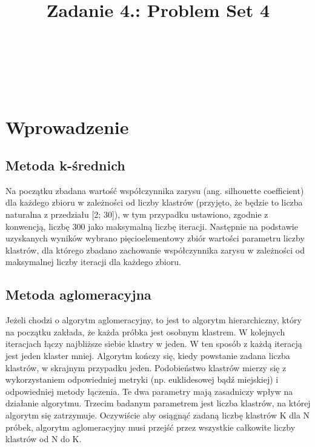\documentclass{classrep}
\author{%
    \studentinfo[239661@edu.p.lodz.pl]{Szymon Gruda}{239661}\\
    \studentinfo[239671@edu.p.lodz.pl]{Jan Karwowski}{239671}\\
    \studentinfo[239673@edu.p.lodz.pl]{Michał Kidawa}{239673}\\
    \studentinfo[239676@edu.p.lodz.pl]{Kamil Kowalewski}{239676}\\
}
\title{Zadanie 4.: Problem Set 4}
\begin{document}
    \maketitle
    \thispagestyle{fancyplain}

    \newpage
    \tableofcontents
    \newpage

    \section{Wprowadzenie}
    \label{intro} {

        \subsection{Metoda k-średnich}
        \label{kmeans_description} {
            Na początku zbadana wartość współczynnika zarysu (ang. silhouette
            coefficient) dla każdego zbioru w zależności od liczby klastrów (przyjęto,
            że będzie to liczba naturalna z przedziału [2; 30]), w tym przypadku
            ustawiono, zgodnie z konwencją, liczbę 300 jako maksymalną liczbę iteracji.
            Następnie na podstawie uzyskanych wyników wybrano pięcioelementowy zbiór
            wartości parametru liczby klastrów, dla którego zbadano zachowanie
            współczynnika zarysu w zależności od maksymalnej liczby iteracji dla
            każdego zbioru.
        }
        
        \subsection{Metoda aglomeracyjna}
        \label{agglomerative_description} {
            Jeżeli chodzi o algorytm aglomeracyjny, to jest to algorytm hierarchiczny,
            który na początku zakłada, że każda próbka jest osobnym klastrem. W
            kolejnych iteracjach łączy najbliższe siebie klastry w jeden. W ten sposób
            z każdą iteracją jest jeden klaster mniej. Algorytm kończy się, kiedy
            powstanie zadana liczba klastrów, w skrajnym przypadku jeden. Podobieństwo
            klastrów mierzy się z wykorzystaniem odpowiedniej metryki (np. euklidesowej
            bądź miejskiej) i odpowiedniej metody łączenia. Te dwa parametry mają
            zasadniczy wpływ na działanie algorytmu. Trzecim badanym parametrem jest
            liczba klastrów, na której algorytm się zatrzymuje. Oczywiście aby osiągnąć
            zadaną liczbę klastrów K dla N próbek, algorytm aglomeracyjny musi przejść
            przez wszystkie całkowite liczby klastrów od N do K.
        }

}
\end{document}
